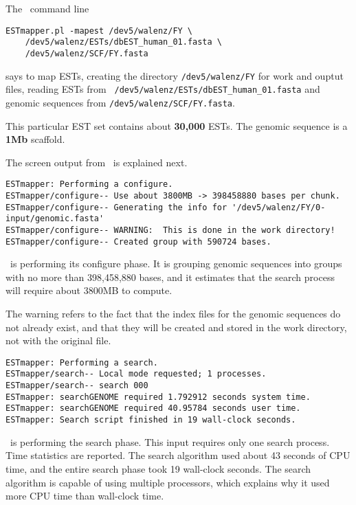 \documentclass[twoside,11pt]{book}
\begin{document}

The \ESTmapper\ command line
\small
\begin{verbatim}
ESTmapper.pl -mapest /dev5/walenz/FY \
    /dev5/walenz/ESTs/dbEST_human_01.fasta \
    /dev5/walenz/SCF/FY.fasta
\end{verbatim}
\normalsize
says to map ESTs, creating the directory {\tt /dev5/walenz/FY} for
work and ouptut files, reading ESTs from {\tt
/dev5/walenz/ESTs/dbEST\_human\_01.fasta} and genomic sequences from
{\tt /dev5/walenz/SCF/FY.fasta}.

This particular EST set contains about {\bf 30,000} ESTs.  The
genomic sequence is a {\bf 1Mb} scaffold.

The screen output from \ESTmapper\ is explained next.

\footnotesize
\begin{verbatim}
ESTmapper: Performing a configure.
ESTmapper/configure-- Use about 3800MB -> 398458880 bases per chunk.
ESTmapper/configure-- Generating the info for '/dev5/walenz/FY/0-input/genomic.fasta'
ESTmapper/configure-- WARNING:  This is done in the work directory!
ESTmapper/configure-- Created group with 590724 bases.
\end{verbatim}
\normalsize

\ESTmapper\ is performing its configure phase.  It is grouping genomic sequences
into groups with no more than 398,458,880 bases, and it estimates that the
search process will require about 3800MB to compute.

The warning refers to the fact that the index files for the genomic sequences
do not already exist, and that they will be created and stored in the work
directory, not with the original file.

\footnotesize
\begin{verbatim}
ESTmapper: Performing a search.
ESTmapper/search-- Local mode requested; 1 processes.
ESTmapper/search-- search 000
ESTmapper: searchGENOME required 1.792912 seconds system time.
ESTmapper: searchGENOME required 40.95784 seconds user time.
ESTmapper: Search script finished in 19 wall-clock seconds.
\end{verbatim}
\normalsize

\ESTmapper\ is performing the search phase.  This input requires only
one search process.  Time statistics are reported.  The search
algorithm used about 43 seconds of CPU time, and the entire search
phase took 19 wall-clock seconds.  The search algorithm is capable of
using multiple processors, which explains why it used more CPU time
than wall-clock time.
\end{document}
